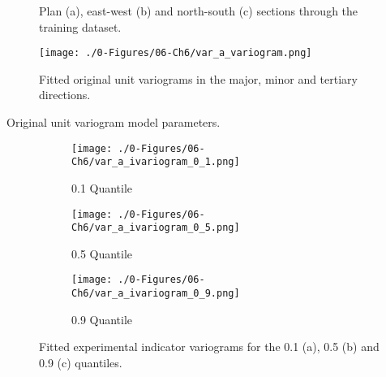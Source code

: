 \begin{figure}
    \centering
    \tabskip=0pt
    \caption{Plan (a), east-west (b) and north-south (c) sections through the training dataset.}
    \label{fig:train_data}
\end{figure}

\begin{figure}[htb!]
    \centering
    \texttt{[image: ./0-Figures/06-Ch6/var\_a\_variogram.png]}
    \caption{Fitted original unit variograms in the major, minor and tertiary directions. }
    \label{fig:orig_expvar}
\end{figure}

\begin{table}[!htb]
    \centering
    \caption{Original unit variogram model parameters.}
    \resizebox{1\width}{!}{}
    \label{tab:orig_expvar}
\end{table}

\begin{figure}
    \begin{subfigure}{1.0\textwidth}
        \centering
        \texttt{[image: ./0-Figures/06-Ch6/var\_a\_ivariogram\_0\_1.png]}
        \caption{0.1 Quantile}
    \end{subfigure}
    \begin{subfigure}{1.0\textwidth}
        \centering
        \texttt{[image: ./0-Figures/06-Ch6/var\_a\_ivariogram\_0\_5.png]}
        \caption{0.5 Quantile}
    \end{subfigure}
    \begin{subfigure}{1.0\textwidth}
        \centering
        \texttt{[image: ./0-Figures/06-Ch6/var\_a\_ivariogram\_0\_9.png]}
        \caption{0.9 Quantile}
    \end{subfigure}
    \caption{Fitted experimental indicator variograms for the 0.1 (a), 0.5 (b) and 0.9 (c) quantiles.}
    \label{fig:ind_expvar}
\end{figure}

